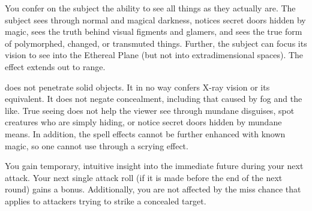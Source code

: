 \spelldur{\durshort}
\begin{spelleffect}
  You confer on the subject the ability to see all things as they actually are. The subject sees through normal and magical darkness, notices secret doors hidden by magic, sees the truth behind visual figments and glamers, and sees the true form of polymorphed, changed, or transmuted things. Further, the subject can focus its vision to see into the Ethereal Plane (but not into extradimensional spaces). The effect extends out to \rngmed range.
\end{spelleffect}
\begin{spellnotes}
   does not penetrate solid objects. It in no way confers X-ray vision or its equivalent. It does not negate concealment, including that caused by fog and the like. True seeing does not help the viewer see through mundane disguises, spot creatures who are simply hiding, or notice secret doors hidden by mundane means. In addition, the spell effects cannot be further enhanced with known magic, so one cannot use  through a scrying effect.
\end{spellnotes}

\begin{spelleffect}
  You gain temporary, intuitive insight into the immediate future during your next attack. Your next single attack roll (if it is made before the end of the next round) gains a  bonus. Additionally, you are not affected by the miss chance that applies to attackers trying to strike a concealed target.
\end{spelleffect}

\begin{comment}
\subsubsection{U-Z}
\end{comment}

